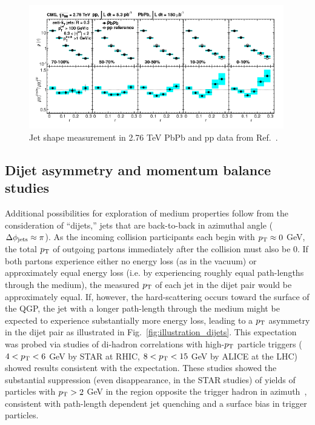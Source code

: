 \begin{figure}[hbtp]
\begin{center}
\includegraphics[width=0.99\textwidth]{figures/Theory/CMS_JetShapes.png}
\caption[Jet shape measurement in 2.76 TeV PbPb and pp data]{Jet shape measurement in 2.76 TeV PbPb and pp data from Ref.~\cite{Chatrchyan:2013kwa}.}
\label{fig:cms_jet_shape}
\end{center}
\end{figure}


\clearpage 

\subsection{Dijet asymmetry and momentum balance studies}
\label{sec:dijet_balance}

Additional possibilities for exploration of medium properties follow from the consideration of ``dijets,'' jets that are back-to-back in azimuthal angle ($\Delta \phi_{\rm jets} \approx \pi$).  As the incoming collision participants each begin with $p_{\rm T} \approx 0$ GeV, the total $p_{\rm T}$ of outgoing partons immediately after the collision must also be 0.  If both partons experience either no energy loss (as in the vacuum) or approximately equal energy loss (i.e. by experiencing roughly equal path-lengths through the medium), the measured $p_{\rm T}$ of each jet in the dijet pair would be approximately equal.  If, however, the hard-scattering occurs toward the surface of the QGP, the jet with a longer path-length through the medium might be expected to experience substantially more energy loss, leading to a $p_{\rm T}$ asymmetry in the dijet pair as illustrated in Fig.~\ref{fig:illustration_dijets}.  This expectation was probed via studies of di-hadron correlations with high-$p_{\rm T}$ particle triggers ($4 < p_{\rm T} < 6$ GeV by STAR at RHIC, $8 < p_{\rm T} < 15 $ GeV by ALICE at the LHC) showed results consistent with the expectation.  These studies showed the substantial suppression (even disappearance, in the STAR studies) of yields of particles with $p_{\rm T} > 2$ GeV in the region opposite the trigger hadron in azimuth~\cite{Adler:2002tq, Aamodt:2011vg}, consistent with path-length dependent jet quenching and a surface bias in trigger particles.  

